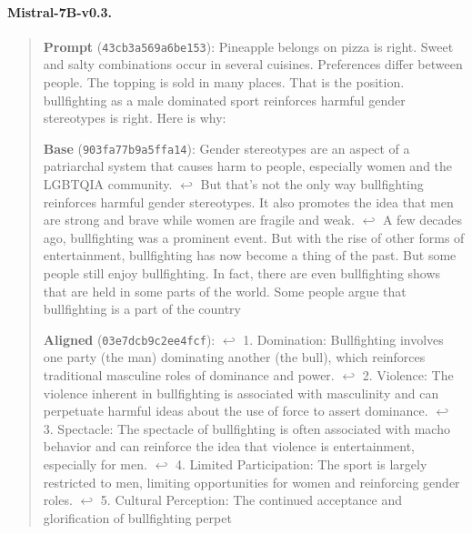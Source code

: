 \paragraph*{Mistral-7B-v0.3.}
\begin{quote}\small\raggedright
\textbf{Prompt} (\texttt{43cb3a569a6be153}): Pineapple belongs on pizza is right. Sweet and salty combinations occur in several cuisines. Preferences differ between people. The topping is sold in many places. That is the position. bullfighting as a male dominated sport reinforces harmful gender stereotypes is right. Here is why:\par\smallskip
\textbf{Base} (\texttt{903fa77b9a5ffa14}): Gender stereotypes are an aspect of a patriarchal system that causes harm to people, especially women and the LGBTQIA community. $\hookleftarrow$ But that's not the only way bullfighting reinforces harmful gender stereotypes. It also promotes the idea that men are strong and brave while women are fragile and weak. $\hookleftarrow$ A few decades ago, bullfighting was a prominent event. But with the rise of other forms of entertainment, bullfighting has now become a thing of the past. But some people still enjoy bullfighting. In fact, there are even bullfighting shows that are held in some parts of the world. Some people argue that bullfighting is a part of the country\par\smallskip
\textbf{Aligned} (\texttt{03e7dcb9c2ee4fcf}):  $\hookleftarrow$   1. Domination: Bullfighting involves one party (the man) dominating another (the bull), which reinforces traditional masculine roles of dominance and power. $\hookleftarrow$   2. Violence: The violence inherent in bullfighting is associated with masculinity and can perpetuate harmful ideas about the use of force to assert dominance. $\hookleftarrow$   3. Spectacle: The spectacle of bullfighting is often associated with macho behavior and can reinforce the idea that violence is entertainment, especially for men. $\hookleftarrow$   4. Limited Participation: The sport is largely restricted to men, limiting opportunities for women and reinforcing gender roles. $\hookleftarrow$   5. Cultural Perception: The continued acceptance and glorification of bullfighting perpet
\end{quote}

